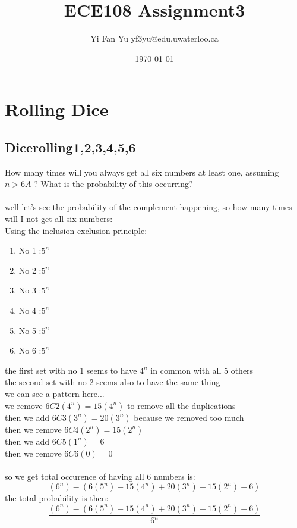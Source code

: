 \documentclass[a4paper,12pt]{article}
\begin{document}
\title{ECE108 Assignment3} \author{Yi Fan Yu yf3yu@edu.uwaterloo.ca} \date{\today}

\maketitle

\tableofcontents
\newpage
\renewcommand\thesubsection{\alph{subsection}}
\section{Rolling Dice}
\subsection{Dicerolling1,2,3,4,5,6}
How many times will you always get all six numbers at least one, assuming $n > 6A$ ?
What is the probability of this occurring?\\
\bigskip\\
well let's see the probability of the complement happening, so how many times will I not get all six numbers:\\
Using the inclusion-exclusion principle:\\
  \begin{enumerate}
    \item No 1 :$5^n$
    \item No 2 :$5^n$
    \item No 3 :$5^n$
    \item No 4 :$5^n$
    \item No 5 :$5^n$
    \item No 6 :$5^n$
  \end{enumerate}
  the first set with no 1 seems to have $4^n$ in common with all 5 others\\
  the second set with no 2 seems also to have the same thing\\
  we can see a pattern here... \\
  we remove $6C2(4^n) = 15(4^n)$ to remove all the duplications\\
  then we add $6C3(3^n) = 20 (3^n)$ because we removed too much\\
  then we remove $6C4(2^n) = 15 (2^n)$\\
  then we add $6C5(1^n) = 6$\\
  then we remove $6C6(0) =0$\\
  \bigskip\\
  so we get total occurence of having all 6 numbers is:\\
  \[(6^n) - (6(5^n) -15(4^n) + 20(3^n)- 15(2^n) + 6) \]
  the total probability is then:\\
  \[\frac{(6^n) - (6(5^n) -15(4^n) + 20(3^n)- 15(2^n) + 6)}{6^n} \]
\end{document}
